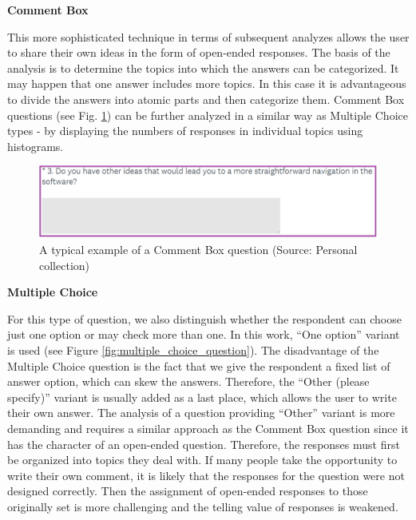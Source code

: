 \documentclass[a4paper,10pt,twoside]{article}
\begin{document}
\smallskip
\vspace*{-0.5cm}
\noindent \textbf {Comment Box}

\noindent This more sophisticated technique in terms of subsequent analyzes allows the user to share their own ideas in the form of open-ended responses. The basis of the analysis is to determine the topics into which the answers can be categorized. It may happen that one answer includes more topics.  In this case it is advantageous to divide the answers into atomic parts and then categorize them. Comment Box questions (see Fig. \ref{fig:comment_box_question}) can be further analyzed in a similar way as Multiple Choice types - by displaying the numbers of responses in individual topics using histograms.

\vspace{0.3cm}
\begin{figure}[hbt!] 
\begin{center}
\includegraphics[width=15cm]{../pictures/comment_box_question.png} 
\caption[A typical example of a Comment Box question]{A typical example of a Comment Box question (Source: Personal collection)}
\label{fig:comment_box_question}
\end{center}
\end{figure}

\smallskip
\vspace*{-0.5cm}
\noindent \textbf {Multiple Choice}

\noindent For this type of question, we also distinguish whether the respondent can choose just one option or may check more than one. In this work, ``One option'' variant is used (see Figure \ref{fig:multiple_choice_question}). The disadvantage of the Multiple Choice question is the fact that we give the respondent a fixed list of answer option, which can skew the answers. Therefore, the ``Other (please specify)'' variant is usually added as a last place, which allows the user to write their own answer. The analysis of a question providing ``Other'' variant is more demanding and requires a similar approach as the Comment Box question since it has the character of an open-ended question. Therefore, the responses must first be organized into topics they deal with. If many people take the opportunity to write their own comment, it is likely that the responses for the question were not designed correctly. Then the assignment of open-ended responses to those originally set is more challenging and the telling value of responses is weakened.
\end{document}
